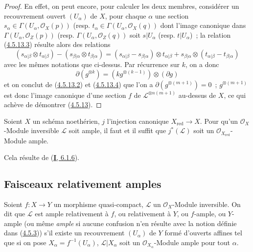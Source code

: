 \begin{proof}
En effet, on peut encore, pour calculer les deux membres, considérer un
recouvrement ouvert $(U_\alpha)$ de $X$, pour chaque $\alpha$ une section
$s_\alpha\in\Gamma(U_\alpha,\mathcal{O}_X(p))$ (resp.
$t_\alpha\in\Gamma(U_\alpha,\mathcal{O}_X(q))$ dont l'image canonique dans
$\Gamma(U_\alpha,\mathcal{O}_Z(p))$ (resp.
$\Gamma(U_\alpha,\mathcal{O}_Z(q))$ soit $s|U_\alpha$ (resp.
$t|U_\alpha$)~; la relation
(\hyperref[II.4.5.13.3-fr]{4.5.13.3}) résulte alors des relations
\[
  (s_{\alpha|\beta}\otimes t_{\alpha|\beta})
  -(s_{\beta|\alpha}\otimes t_{\beta|\alpha})
  =(s_{\alpha|\beta}-s_{\beta|\alpha})\otimes t_{\alpha|\beta}
  +s_{\beta|\alpha}\otimes(t_{\alpha|\beta}-t_{\beta|\alpha})
\]
avec les mêmes notations que ci-dessus. Par récurrence sur $k$, on a donc
\begin{equation}
\label{II.4.5.13.4-fr}
  \partial(g^{\otimes k})=(kg^{\otimes(k-1)})\otimes(\partial g)
\tag{4.5.13.4}
\end{equation}
et on conclut de (\hyperref[II.4.5.13.2-fr]{4.5.13.2}) et
(\hyperref[II.4.5.13.4-fr]{4.5.13.4}) que l'on a
$\partial(g^{\otimes(m+1)})=0$~; $g^{\otimes(m+1)}$ est donc l'image
canonique d'une section $f$ de $\mathcal{L}^{\otimes n(m+1)}$ au-dessus de
$X$, ce qui achève de démontrer (\hyperref[II.4.5.13-fr]{4.5.13}).
\end{proof}

\begin{corollary}[4.5.14]
\label{II.4.5.14-fr}
Soient $X$ un schéma noethérien, $j$ l'injection canonique
$X_{\mathrm{red}}\to X$. Pour qu'un $\mathcal{O}_X$-Module inversible
$\mathcal{L}$ soit ample, il faut et il suffit que $j^*(\mathcal{L})$ soit
un $\mathcal{O}_{X_{\mathrm{red}}}$-Module ample.
\end{corollary}

Cela résulte de (\hyperref[I.6.1.6-fr]{\textbf{I}, 6.1.6}).

\subsection{Faisceaux relativement amples}
\label{II.4.6-fr}

\begin{definition}[4.6.1]
\label{II.4.6.1-fr}
Soient $f:X\to Y$ un morphisme quasi-compact, $\mathcal{L}$ un
$\mathcal{O}_X$-Module inversible. On dit que $\mathcal{L}$ est ample
relativement à $f$, ou relativement à $Y$, ou $f$-ample, ou $Y$-ample \textup{(ou
même \emph{ample} si aucune confusion n'en résulte avec la notion définie dans
(\hyperref[II.4.5.3-fr]{4.5.3}))} s'il existe un recouvrement $(U_\alpha)$
de $Y$ formé d'ouverts affines tel que si on pose
$X_\alpha=f^{-1}(U_\alpha)$, $\mathcal{L}|X_\alpha$ soit un
$\mathcal{O}_{X_\alpha}$-Module ample pour tout $\alpha$.
\end{definition}

